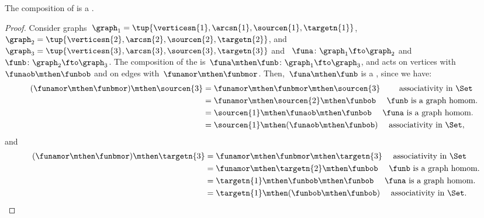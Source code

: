 {\begin{lemma}
    \label{lem:composing_homomorphisms}
    The composition of  is a .
\end{lemma}
%
\begin{proof}
    Consider graphs~$\graph_1=\tup{\verticesn{1},\arcsn{1},\sourcen{1},\targetn{1}}$,~$\graph_2=\tup{\verticesn{2},\arcsn{2},\sourcen{2},\targetn{2}}$, and~$\graph_3=\tup{\verticesn{3},\arcsn{3},\sourcen{3},\targetn{3}}$ and
    ~$\funa \colon \graph_1 \fto \graph_2$ and~$\funb \colon \graph_2 \fto \graph_3$.
    The composition of the  is~$\funa\mthen \funb \colon \graph_1 \fto \graph_3$, and acts on vertices with~$\funaob \mthen \funbob$ and on edges with~$\funamor \mthen \funbmor$.
    Then,~$\funa\mthen \funb$ is a , since we have:
    \begin{equation}
        \begin{aligned}
            (\funamor\mthen \funbmor) \mthen \sourcen{3} & =\funamor\mthen \funbmor \mthen \sourcen{3} \qquad \text{ associativity in \Set} \\
                                                         & =\funamor\mthen \sourcen{2} \mthen \funbob \quad \text{ $\funb$ is a graph homom.
            } \\
                                                         & =\sourcen{1} \mthen \funaob\mthen \funbob \quad \text{ $\funa$ is a graph homom.} \\
                                                         & =\sourcen{1} \mthen (\funaob\mthen \funbob) \quad \text{ associativity in \Set},
        \end{aligned}
    \end{equation}
    and
    \begin{equation}
        \begin{aligned}
            (\funamor \mthen \funbmor) \mthen \targetn{3} & =\funamor \mthen \funbmor \mthen \targetn{3} \quad \text{ associativity in \Set} \\
                                                          & =\funamor \mthen \targetn{2}\mthen \funbob \quad \text{ $\funb$ is a graph homom.} \\
                                                          & =\targetn{1} \mthen \funbob\mthen \funbob \quad \text{ $\funa$ is a graph homom.} \\
                                                          & =\targetn{1} \mthen (\funbob\mthen \funbob)\quad \text{ associativity in \Set}.

\end{aligned}
\end{equation}
\end{proof}}
